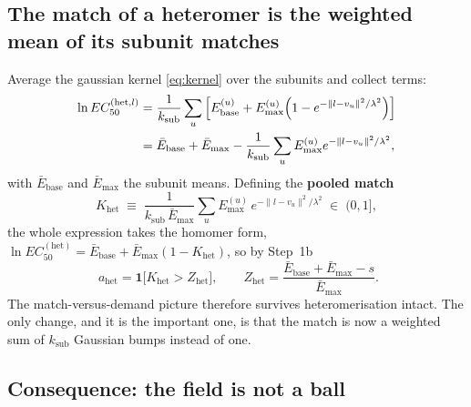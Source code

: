 \documentclass[11pt,a4paper]{article}
\newcommand{\ksub}{k_{\mathrm{sub}}}
\newcommand{\Ebase}{E_{\mathrm{base}}}
\newcommand{\Emax}{E_{\mathrm{max}}}
\begin{document}
\subsection{The match of a heteromer is the weighted mean of its subunit matches}

Average the gaussian kernel \eqref{eq:kernel} over the subunits and collect terms:
\begin{align}
  \ln EC_{50}^{(\mathrm{het},l)}
   &= \frac{1}{\ksub}\sum_{u}\left[\Ebase^{(u)}
      +\Emax^{(u)}\Big(1-e^{-\|l-v_u\|^2/\lambda^2}\Big)\right] \notag\\
   &= \bar{E}_{\mathrm{base}} + \bar{E}_{\mathrm{max}}
      - \frac{1}{\ksub}\sum_u \Emax^{(u)} e^{-\|l-v_u\|^2/\lambda^2},
\end{align}
with $\bar{E}_{\mathrm{base}}$ and $\bar{E}_{\mathrm{max}}$ the subunit means. Defining
the \textbf{pooled match}
\begin{equation}
  K_{\mathrm{het}} \;\equiv\;
   \frac{1}{\ksub\,\bar{E}_{\mathrm{max}}}\sum_u \Emax^{(u)}\,
   e^{-\|l-v_u\|^2/\lambda^2}
   \;\in\;(0,1],
\end{equation}
the whole expression takes the homomer form,
$\ln EC_{50}^{(\mathrm{het})}=\bar{E}_{\mathrm{base}}
 +\bar{E}_{\mathrm{max}}(1-K_{\mathrm{het}})$, so by Step~1b
\begin{equation}
  \boxed{\;a_{\mathrm{het}}=\mathbf{1}\big[K_{\mathrm{het}}>Z_{\mathrm{het}}\big],
  \qquad
  Z_{\mathrm{het}}=\frac{\bar{E}_{\mathrm{base}}+\bar{E}_{\mathrm{max}}-s}
                        {\bar{E}_{\mathrm{max}}} . }
\end{equation}
The match-versus-demand picture therefore survives heteromerisation intact. The only
change, and it is the important one, is that the match is now a weighted sum of
$\ksub$ Gaussian bumps instead of one.

\subsection{Consequence: the field is not a ball}
\end{document}
